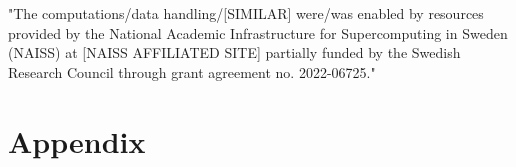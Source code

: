 \documentclass{article}
\begin{document}
\newpage
"The computations/data handling/[SIMILAR] were/was enabled by resources provided by the National Academic Infrastructure for Supercomputing in Sweden (NAISS) at [NAISS AFFILIATED SITE] partially funded by the Swedish Research Council through grant agreement no. 2022-06725."
\section*{Appendix}


\end{document}

